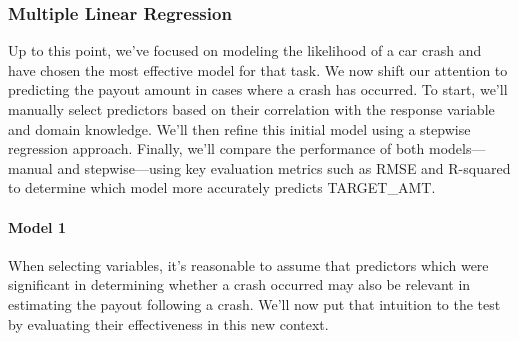 \documentclass[
]{article}
\begin{document}
\subsubsection{Multiple Linear
Regression}\label{multiple-linear-regression}

Up to this point, we've focused on modeling the likelihood of a car
crash and have chosen the most effective model for that task. We now
shift our attention to predicting the payout amount in cases where a
crash has occurred. To start, we'll manually select predictors based on
their correlation with the response variable and domain knowledge. We'll
then refine this initial model using a stepwise regression approach.
Finally, we'll compare the performance of both models---manual and
stepwise---using key evaluation metrics such as RMSE and R-squared to
determine which model more accurately predicts TARGET\_AMT.

\paragraph{Model 1}\label{model-1-1}

When selecting variables, it's reasonable to assume that predictors
which were significant in determining whether a crash occurred may also
be relevant in estimating the payout following a crash. We'll now put
that intuition to the test by evaluating their effectiveness in this new
context.
\end{document}
